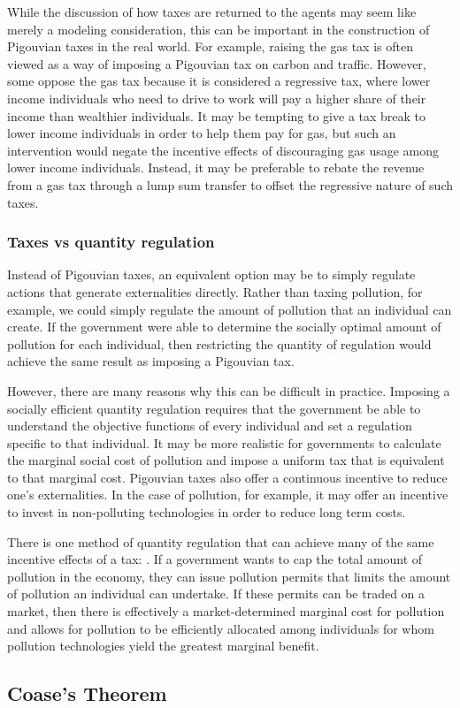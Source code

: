 While the discussion of how taxes are returned to the agents may seem like merely a modeling consideration, this can be important in the construction of Pigouvian taxes in the real world. For example, raising the gas tax is often viewed as a way of imposing a Pigouvian tax on carbon and traffic. However, some oppose the gas tax because it is considered a regressive tax, where lower income individuals who need to drive to work will pay a higher share of their income than wealthier individuals. It may be tempting to give a tax break to lower income individuals in order to help them pay for gas, but such an intervention would negate the incentive effects of discouraging gas usage among lower income individuals. Instead, it may be preferable to rebate the revenue from a gas tax through a lump sum transfer to offset the regressive nature of such taxes.

\subsubsection*{Taxes vs quantity regulation}
Instead of Pigouvian taxes, an equivalent option may be to simply regulate actions that generate externalities directly. Rather than taxing pollution, for example, we could simply regulate the amount of pollution that an individual can create. If the government were able to determine the socially optimal amount of pollution for each individual, then restricting the quantity of regulation would achieve the same result as imposing a Pigouvian tax.

However, there are many reasons why this can be difficult in practice. Imposing a socially efficient quantity regulation requires that the government be able to understand the objective functions of every individual and set a regulation specific to that individual. It may be more realistic for governments to calculate the marginal social cost of pollution and impose a uniform tax that is equivalent to that marginal cost. Pigouvian taxes also offer a continuous incentive to reduce one's externalities. In the case of pollution, for example, it may offer an incentive to invest in non-polluting technologies in order to reduce long term costs. 

There is one method of quantity regulation that can achieve many of the same incentive effects of a tax: . If a government wants to cap the total amount of pollution in the economy, they can issue pollution permits that limits the amount of pollution an individual can undertake. If these permits can be traded on a market, then there is effectively a market-determined marginal cost for pollution and allows for pollution to be efficiently allocated among individuals for whom pollution technologies yield the greatest marginal benefit. 

\subsection*{Coase's Theorem}